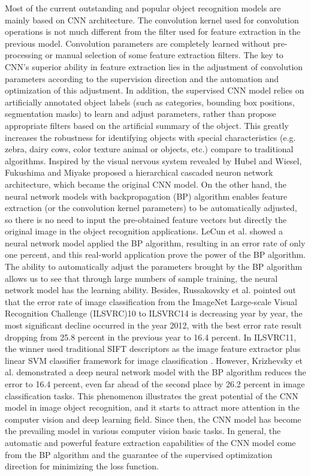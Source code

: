 \documentclass[10pt, a4paper]{IEEEtran} %
\begin{document}
	Most of the current outstanding and popular object recognition models are mainly based on CNN architecture. The convolution kernel used for convolution operations is not much different from the filter used for feature extraction in the previous model. Convolution parameters are completely learned without pre-processing or manual selection of some feature extraction filters. The key to CNN's superior ability in feature extraction lies in the adjustment of convolution parameters according to the supervision direction and the automation and optimization of this adjustment. In addition, the supervised CNN model relies on artificially annotated object labels (such as categories, bounding box positions, segmentation masks) to learn and adjust parameters, rather than propose appropriate filters based on the artificial summary of the object. This greatly increases the robustness for identifying objects with special characteristics (e.g. zebra, dairy cows, color texture animal or objects, etc.) compare to traditional algorithms. Inspired by the visual nervous system revealed by Hubel and Wiesel, Fukushima and Miyake \cite{fukushima1982neocognitron} proposed a hierarchical cascaded neuron network architecture, which became the original CNN model. On the other hand, the neural network models with backpropagation (BP) algorithm enables feature extraction (or the convolution kernel parameters) to be automatically adjusted, so there is no need to input the pre-obtained feature vectors but directly the original image in the object recognition applications. LeCun et al. \cite{lecun1989handwritten} showed a neural network model applied the BP algorithm, resulting in an error rate of only one percent, and this real-world application prove the power of the BP algorithm. The ability to automatically adjust the parameters brought by the BP algorithm allows us to see that through large numbers of sample training, the neural network model has the learning ability. Besides, Russakovsky et al. \cite{russakovskyimagenet} pointed out that the error rate of image classification from the ImageNet Large-scale Visual Recognition Challenge (ILSVRC)10 to ILSVRC14 is decreasing year by year, the most significant decline occurred in the year 2012, with the best error rate result dropping from 25.8 percent in the previous year to 16.4 percent. In ILSVRC11, the winner used traditional SIFT descriptors as the image feature extractor plus linear SVM classifier framework for image classification \cite{sanchez2011high}. However, Krizhevsky et al. \cite{krizhevsky2017imagenet} demonstrated a deep neural network model with the BP algorithm reduces the error to 16.4 percent, even far ahead of the second place by 26.2 percent in image classification tasks. This phenomenon illustrates the great potential of the CNN model in image object recognition, and it starts to attract more attention in the computer vision and deep learning field. Since then, the CNN model has become the prevailing model in various computer vision basic tasks. In general, the automatic and powerful feature extraction capabilities of the CNN model come from the BP algorithm and the guarantee of the supervised optimization direction for minimizing the loss function.
\end{document}
